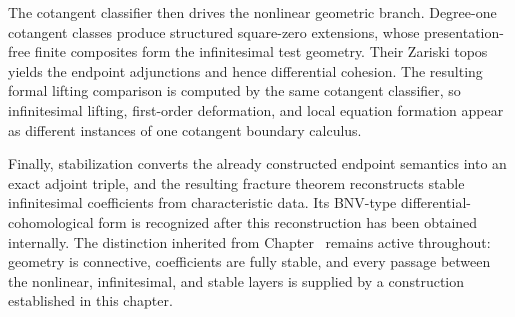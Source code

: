 The cotangent classifier then drives the nonlinear geometric branch.
Degree-one cotangent classes produce structured square-zero extensions, whose
presentation-free finite composites form the infinitesimal test geometry.
Their Zariski topos yields the endpoint adjunctions and hence differential
cohesion. The resulting formal lifting comparison is computed by the same
cotangent classifier, so infinitesimal lifting, first-order deformation, and
local equation formation appear as different instances of one cotangent
boundary calculus.

Finally, stabilization converts the already constructed endpoint semantics
into an exact adjoint triple, and the resulting fracture theorem reconstructs
stable infinitesimal coefficients from characteristic data. Its BNV-type
differential-cohomological form is recognized after this reconstruction has
been obtained internally. The
distinction inherited from Chapter~
remains active throughout: geometry is connective, coefficients are fully
stable, and every passage between the nonlinear, infinitesimal, and stable
layers is supplied by a construction established in this chapter.

